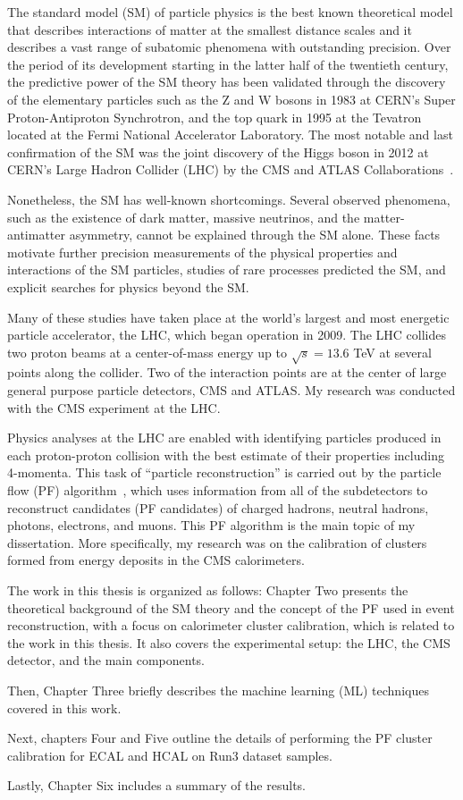 
The standard model (SM) of particle physics %
is the best known theoretical model that describes interactions of matter at the smallest %
distance scales and it describes a vast range of subatomic phenomena with outstanding precision. Over the period of its development starting in the latter half of the twentieth century, the predictive power of the SM theory has been validated through the discovery of the elementary particles such as the Z and W bosons in 1983 at CERN's Super Proton-Antiproton Synchrotron, and the top quark in 1995 at the Tevatron located at the Fermi National Accelerator Laboratory. The most notable and last confirmation of the SM was the joint discovery of the Higgs boson in 2012 at CERN's Large Hadron Collider (LHC) by the CMS and ATLAS Collaborations~\cite{ATLAS:2012yve,CMS:2012qbp,CMS:2013btf}.

Nonetheless, the SM has well-known shortcomings. Several observed phenomena, such as the existence of dark matter, massive neutrinos, and the matter-antimatter asymmetry, cannot be explained through the SM alone.
These facts motivate further precision measurements of the physical properties and interactions of the SM particles, studies of rare processes predicted the SM, and explicit searches for physics beyond the SM.

Many of these studies have taken place at the world's largest and most energetic particle accelerator, the LHC, which began operation in 2009. The LHC collides two proton beams at a center-of-mass energy up to $\sqrt{s}=13.6$ TeV at several points along the collider. Two of the interaction points are at the center of large general purpose particle detectors, CMS and ATLAS. My research was conducted with the CMS experiment at the LHC.

Physics analyses at the LHC are enabled with identifying particles produced in each proton-proton collision with the best estimate of their properties including 4-momenta.
This task of ``particle reconstruction'' is carried out by the particle flow (PF) algorithm~\cite{PF}, which uses information from all of the subdetectors
to reconstruct candidates (PF candidates) of charged hadrons, neutral hadrons, photons, electrons, and muons.
This PF algorithm is the main topic of my dissertation.
More specifically, my research was on the calibration of clusters formed from energy deposits in the CMS calorimeters.

The work in this thesis is organized as follows:
Chapter Two presents the theoretical background of the SM theory and the concept of the PF used in event reconstruction, with a focus on calorimeter cluster calibration, which is related to the work in this thesis. It also covers the experimental setup: the LHC, the CMS detector, and the main components.

Then, Chapter Three briefly describes	the machine learning (ML) techniques covered in	this work.

Next, chapters Four and Five outline the details of performing the PF cluster calibration for ECAL and HCAL on Run3 dataset samples.

Lastly, Chapter Six includes a summary of the results.
